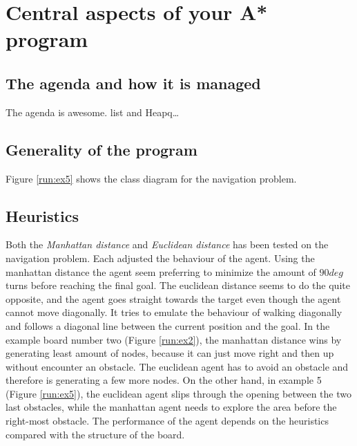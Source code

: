 \section{Central aspects of your A* program}
\subsection{The agenda and how it is managed}
The agenda is awesome. list and Heapq\ldots

\subsection{Generality of the program}



Figure \ref{run:ex5} shows the class diagram for the navigation problem.

\subsection{Heuristics}
Both the \emph{Manhattan distance} and \emph{Euclidean distance} has been tested on the navigation problem. Each adjusted the behaviour of the agent. Using the manhattan distance the agent seem preferring to minimize the amount of \(90 deg\) turns before reaching the final goal. The euclidean distance seems to do the quite opposite, and the agent goes straight towards the target even though the agent cannot move diagonally. It tries to emulate the behaviour of walking diagonally and follows a diagonal line between the current position and the goal. In the example board number two (Figure \ref{run:ex2}), the manhattan distance wins by generating least amount of nodes, because it can just move right and then up without encounter an obstacle. The euclidean agent has to avoid an obstacle and therefore is generating a few more nodes. On the other hand, in example 5 (Figure \ref{run:ex5}), the euclidean agent slips through the opening between the two last obstacles, while the manhattan agent needs to explore the area before the right-most obstacle. The performance of the agent depends on the heuristics compared with the structure of the board.

